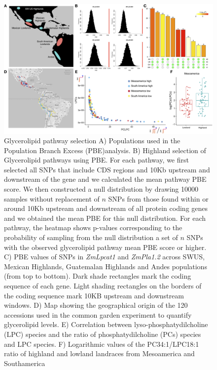 \documentclass[9pt,twocolumn,twoside,lineno]{gsajnl}
\begin{document}
\begin{figure}[ht]
\begin{center}
\includegraphics[width=0.8\paperwidth]{Figures/Fig_1.png}
\caption{Glycerolipid pathway selection 
A) Populations used in the Population Branch Excess (PBE)analysis. 
B) Highland selection of Glycerolipid pathways using PBE. 
For each pathway, we first selected all SNPs that include CDS regions and 10Kb upstream and downstream of the gene and we calculated the mean pathway PBE score. 
We then constructed a null distribution by drawing 10000 samples without replacement of $n$ SNPs from those found within or around 10Kb upstream and downstream of all protein coding genes and we obtained the mean PBE for this null distribution. 
For each pathway, the heatmap shows p-values corresponding to the probability of sampling from the null distribution a set of $n$ SNPs with the observed glycerolipid pathway mean PBE score or higher.
C) PBE values of SNPs in \textit{ZmLpcat1} and \textit{ ZmPla1.2} across SWUS, Mexican Highlands, Guatemalan Highlands and Andes populations (from top to bottom). Dark shade rectangles mark the coding sequence of each gene. Light shading rectangles on the borders of the coding sequence mark 10KB upstream and downstream windows. 
D) Map showing the geographical origin of the 120 accessions used in the common garden experiment to quantify glycerolipid levels.
E) Correlation between  lyso-phosphatydilcholine (LPC) species and the ratio of  phosphatydilcholine (PCs) species and LPC species. 
F) Logarithmic values of the PC34:1/LPC18:1 ratio of highland and lowland landraces from Mesoamerica and Southamerica} 

\label{Fig1}
\end{center}
\end{figure} 
\end{document}
